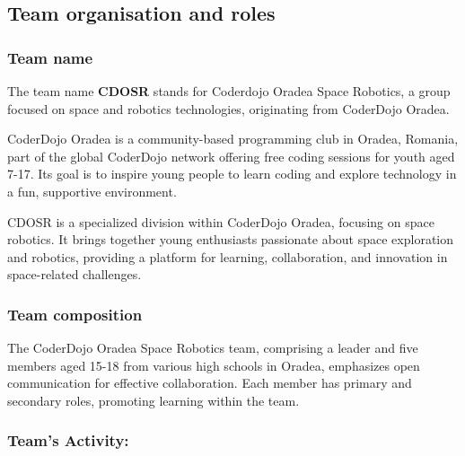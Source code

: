 \subsection{Team organisation and roles}

\subsubsection{Team name}
The team name {\textbf{CDOSR}} stands for Coderdojo Oradea Space Robotics, a group focused on space and robotics technologies, originating from CoderDojo Oradea. 

CoderDojo Oradea is a community-based programming club in Oradea, Romania, part of the global CoderDojo network offering free coding sessions for youth aged 7-17. Its goal is to inspire young people to learn coding and explore technology in a fun, supportive environment.

CDOSR is a specialized division within CoderDojo Oradea, focusing on space robotics. It brings together young enthusiasts passionate about space exploration and robotics, providing a platform for learning, collaboration, and innovation in space-related challenges.


\subsubsection{Team composition}

The CoderDojo Oradea Space Robotics team, comprising a leader and five members aged 15-18 from various high schools in Oradea, emphasizes open communication for effective collaboration. Each member has primary and secondary roles, promoting learning within the team.
\vspace{1cm}
\begin{itemize}
    
    
    
    
    
    

\end{itemize}

\subsubsection{Team's Activity:} 

